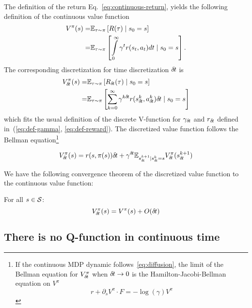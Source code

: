 The definition of the return Eq.~\eqref{eq:continuous-return}, yields the
following definition of the continuous value function
\begin{align}
  V^\pi(s) =& \mathbb{E}_{\tau\sim\pi}\left[R(\tau) \mid s_0 = s\right]\\
  =& \mathbb{E}_{\tau\sim\pi}\left[\int\limits_{0}^\infty \gamma^{t} r(s_t, a_t) dt \mid s_0 = s\right].
\end{align}
The corresponding discretization for time discretization ${\delta\hspace{-.1em}t}$ is
\begin{align}
  V^\pi_{\delta\hspace{-.1em}t}(s) =& \mathbb{E}_{\tau\sim\pi}\left[R_{\delta\hspace{-.1em}t}(\tau) \mid s_0 = s\right]\\
  =& \mathbb{E}_{\tau\sim\pi}\left[\sum\limits_{k=0}^\infty \gamma^{k{\delta\hspace{-.1em}t}}r(s^k_{{\delta\hspace{-.1em}t}}, a^k_{{\delta\hspace{-.1em}t}}){\delta\hspace{-.1em}t} \mid s_0 = s\right]
\end{align}
which fits the usual definition of the discrete V-function for $\gamma_{\delta\hspace{-.1em}t}$ and
$r_{\delta\hspace{-.1em}t}$ defined in~(\ref{eq:def-gamma}, \ref{eq:def-reward}).
The discretized value function follows the Bellman equation\footnote{
	If the continuous MDP dynamic follows~\eqref{eq:diffusion}, the limit of the Bellman equation for $V^\pi_{\delta\hspace{-.1em}t}$ when ${\delta\hspace{-.1em}t} \rightarrow 0$ is the Hamilton-Jacobi-Bellman equation on $V^\pi$ \cite{cont_rl}
\begin{equation}
  \label{eq:hamilton-jacobi-bellman}
  r + \partial_s V^\pi \cdot F = - \log(\gamma) V^\pi
\end{equation}}

\begin{equation}
  \label{eq:bellman}
  V^\pi_{\delta\hspace{-.1em}t}(s) = {r}(s, \pi(s)){\delta\hspace{-.1em}t} + \gamma^{{\delta\hspace{-.1em}t}} \mathbb{E}_{s_{{\delta\hspace{-.1em}t}}^{k+1} | s_{{\delta\hspace{-.1em}t}}^{k} = s} V^\pi_{\delta\hspace{-.1em}t}(s_{{\delta\hspace{-.1em}t}}^{k+1})
\end{equation}

We have the following convergence theorem of the discretized value function to the continuous value function:
  \begin{theorem}
   For all $s \in {\cal S}$:
    \begin{equation}
      \label{eq:conv-value}
      V^\pi_{\delta\hspace{-.1em}t}(s) = V^\pi(s) + O({\delta\hspace{-.1em}t})
    \end{equation}
    \label{th:conv-value}
  \end{theorem}


\subsection{There is no Q-function in continuous time}

